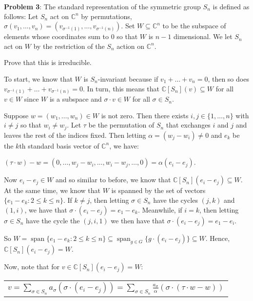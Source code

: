 \documentclass{book}
\newcommand{\exOne}{%
   \color{Purple}%
   \fontsize{13}{15}\selectfont%
}
\newenvironment{myIndent}{%
   \begin{adjustwidth}{2.5em}{0em}%
}{%
   \end{adjustwidth}%
}
\newcommand{\blab}[1]{\textbf{#1}}
\DeclareMathOperator{\Span}{span}
\newcommand{\retTwo}{\hfill\bigbreak}
\begin{document}
\blab{Problem 3}: The standard representation of the symmetric group $S_n$ is defined as follows: Let $S_n$ act on $\mathbb{C}^n$ by permutations, $\sigma(v_1, \ldots, v_n) = (v_{\sigma^{-1}(1)}, \ldots, v_{\sigma^{-1}(n)})$. Set $W \subseteq \mathbb{C}^n$ to be the subspace of elements whose coordinates sum to $0$ so that $W$ is $n-1$ dimensional. We let $S_n$ act on $W$ by the restriction of the $S_n$ action on $\mathbb{C}^n$.\retTwo

Prove that this is irreducible.

\begin{myIndent}\exOne
	To start, we know that $W$ is $S_n$-invariant because if $v_1 + \ldots + v_n = 0$, then so does $v_{\sigma^{-1}(1)} + \ldots + v_{\sigma^{-1}(n)} = 0$. In turn, this means that $\mathbb{C}[S_n](v) \subseteq W$ for all $v \in W$ since $W$ is a subspace and $\sigma \cdot v \in W$ for all $\sigma \in S_n$.\retTwo

	Suppose $w = (w_1, \ldots, w_n) \in W$ is not zero. Then there exists $i,j \in \{1, \ldots, n\}$ with $i \neq j$ so that $w_i \neq w_j$. Let $\tau$ be the permutation of $S_n$ that exchanges $i$ and $j$ and leaves the rest of the indices fixed. Then letting $\alpha = (w_j - w_i) \neq 0$ and $e_k$ be the $k$th standard basis vector of $\mathbb{C}^n$, we have:
	
	{\centering $(\tau \cdot w) - w = (0, \ldots, w_j - w_i, \ldots, w_i - w_j, \ldots, 0) = \alpha(e_i - e_j)$.\retTwo\par}

	Now $e_i - e_j \in W$ and so similar to before, we know that $\mathbb{C}[S_n](e_i - e_j) \subseteq W$. At the same time, we know that $W$ is spanned by the set of vectors $\{e_1 - e_k \colon 2 \leq k \leq n\}$. If $k \neq j$, then letting $\sigma \in S_n$ have the cycles $(j, k)$ and $(1, i)$, we have that $\sigma \cdot (e_i - e_j) = e_1 - e_k$. Meanwhile, if $i = k$, then letting $\sigma \in S_n$ have the cycle the $(j, i, 1)$ we then have that $\sigma \cdot (e_i - e_j) = e_1 - e_i$.\newpage

	So $W = \Span\{e_1 - e_k \colon 2 \leq k \leq n\} \subseteq \Span_{g \in G}\{g \cdot (e_i - e_j)\} \subseteq W$. Hence, $\mathbb{C}[S_n](e_i - e_j) = W$.\retTwo

	Now, note that for $v \in \mathbb{C}[S_n](e_i - e_j) = W$:

	{\center
	\begin{tabular}{l}
		$v = \sum\limits_{\sigma \in S_n} a_{\sigma}(\sigma \cdot (e_i - e_j)) = \sum\limits_{\sigma \in S_n} \frac{a_{\sigma}}{\alpha}(\sigma \cdot (\tau \cdot w - w))$\\ [14pt]


\end{tabular}}
\end{myIndent}
\end{document}
